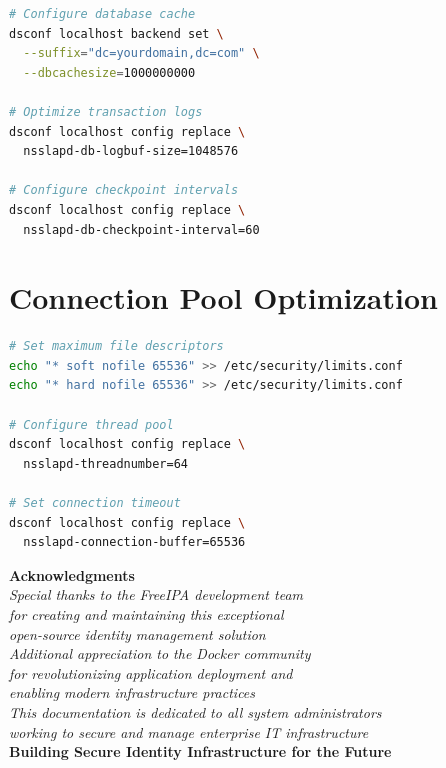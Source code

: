 \documentclass[12pt,a4paper]{report}
\begin{document}
\begin{appendices}
\begin{lstlisting}[language=bash,caption=Advanced Database Tuning]
# Configure database cache
dsconf localhost backend set \
  --suffix="dc=yourdomain,dc=com" \
  --dbcachesize=1000000000

# Optimize transaction logs
dsconf localhost config replace \
  nsslapd-db-logbuf-size=1048576

# Configure checkpoint intervals
dsconf localhost config replace \
  nsslapd-db-checkpoint-interval=60
\end{lstlisting}

\section{Connection Pool Optimization}

\begin{lstlisting}[language=bash,caption=Connection Pool Configuration]
# Set maximum file descriptors
echo "* soft nofile 65536" >> /etc/security/limits.conf
echo "* hard nofile 65536" >> /etc/security/limits.conf

# Configure thread pool
dsconf localhost config replace \
  nsslapd-threadnumber=64

# Set connection timeout
dsconf localhost config replace \
  nsslapd-connection-buffer=65536
\end{lstlisting}

\end{appendices}

\begin{titlepage}
    \centering
    \vspace*{5cm}
    {\color{blue!70!black}\Huge\textbf{Acknowledgments}}\\[1cm]
    {\Large\textit{Special thanks to the FreeIPA development team}}\\[0.5cm]
    {\large\textit{for creating and maintaining this exceptional}}\\[0.3cm]
    {\large\textit{open-source identity management solution}}\\[2cm]
    {\large\textit{Additional appreciation to the Docker community}}\\[0.3cm]
    {\large\textit{for revolutionizing application deployment and}}\\[0.3cm]
    {\large\textit{enabling modern infrastructure practices}}\\[2cm]
    {\large\textit{This documentation is dedicated to all system administrators}}\\[0.3cm]
    {\large\textit{working to secure and manage enterprise IT infrastructure}}\\[2cm]
    \colorbox{orange!80!black}{
        \color{white}\textbf{Building Secure Identity Infrastructure for the Future}
    }
\end{titlepage}
\end{document}
